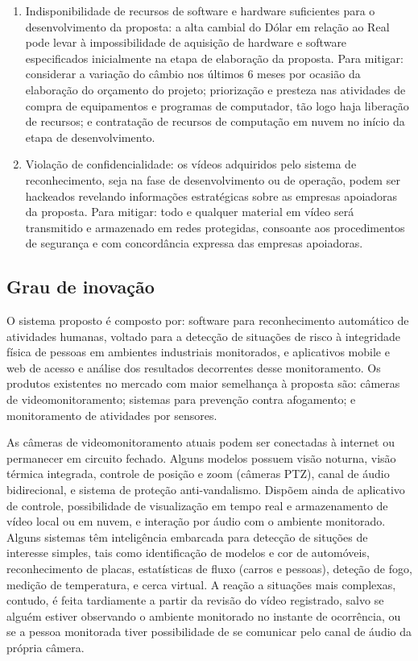 \begin{enumerate}
	\item Indisponibilidade de recursos de software e hardware suficientes para o desenvolvimento da proposta: a alta cambial do Dólar em relação ao Real pode levar à impossibilidade de aquisição de hardware e software especificados inicialmente na etapa de elaboração da proposta. Para mitigar: considerar a variação do câmbio nos últimos 6 meses por ocasião da elaboração do orçamento do projeto; priorização e presteza nas atividades de compra de equipamentos e programas de computador, tão logo haja liberação de recursos; e contratação de recursos de computação em nuvem no início da etapa de desenvolvimento.
	\item Violação de confidencialidade: os vídeos adquiridos pelo sistema de reconhecimento, seja na fase de desenvolvimento ou de operação, podem ser hackeados revelando informações estratégicas sobre as empresas apoiadoras da proposta. Para mitigar: todo e qualquer material em vídeo será transmitido e armazenado em redes protegidas, consoante aos procedimentos de segurança e com concordância expressa das empresas apoiadoras. 
\end{enumerate}


\subsection{Grau de inovação}
\label{ssec:inova}
O sistema proposto é composto por: software para reconhecimento automático de atividades humanas, voltado para a detecção de situações de risco à integridade física de pessoas em ambientes industriais monitorados, e aplicativos mobile e web de acesso e análise dos resultados decorrentes desse monitoramento. 
Os produtos existentes no mercado com maior semelhança à proposta são: câmeras de videomonitoramento; sistemas para prevenção contra afogamento; e monitoramento de atividades por sensores. 

As câmeras de videomonitoramento atuais podem ser conectadas à internet ou permanecer em circuito fechado. Alguns modelos possuem visão noturna, visão térmica integrada, controle de posição e zoom (câmeras PTZ), canal de áudio bidirecional, e sistema de proteção anti-vandalismo. Dispõem ainda de aplicativo de controle, possibilidade de visualização em tempo real e armazenamento de vídeo local ou em nuvem, e interação por áudio com o ambiente monitorado. Alguns sistemas têm inteligência embarcada para detecção de situções de interesse simples, tais como identificação de modelos e cor de automóveis, reconhecimento de placas, estatísticas de fluxo (carros e pessoas), deteção de fogo, medição de temperatura, e cerca virtual. A reação a situações mais complexas, contudo, é feita tardiamente a partir da revisão do vídeo registrado, salvo se alguém estiver observando o ambiente monitorado no instante de ocorrência, ou se a pessoa monitorada tiver possibilidade de se comunicar pelo canal de áudio da própria câmera. 

